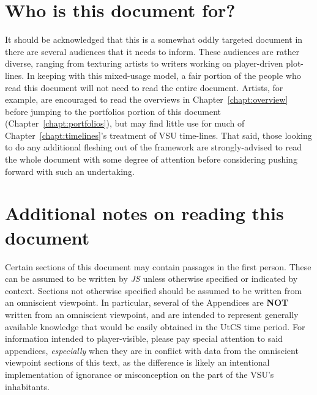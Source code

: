 \section*{Who is this document for?}
It should be acknowledged that this is a somewhat oddly targeted
document in there are several audiences that it needs to inform. These
audiences are rather diverse, ranging from texturing artists to
writers working on player-driven plot-lines. In keeping with this
mixed-usage model, a fair portion of the people who read this document
will not need to read the entire document. Artists, for example, are
encouraged to read the overviews in Chapter~\ref{chapt:overview}
before jumping to the portfolios portion of this document
(Chapter~\ref{chapt:portfolios}), but may find little use for much of
Chapter~\ref{chapt:timelines}'s treatment of VSU time-lines. That said,
those looking to do any additional fleshing out of the framework are
strongly-advised to read the whole document with some degree of
attention before considering pushing forward with such an undertaking.

\section*{Additional notes on reading this document}
Certain sections of this document may contain passages in the first
person. These can be assumed to be written by {\it JS} unless
otherwise specified or indicated by context. Sections not otherwise
specified should be assumed to be written from an omniscient
viewpoint. In particular, several of the Appendices are {\bf NOT}
written from an omniscient viewpoint, and are intended to represent
generally available knowledge that would be easily obtained in the
UtCS time period. For information intended to player-visible, please
pay special attention to said appendices, {\it especially} when they
are in conflict with data from the omniscient viewpoint sections of
this text, as the difference is likely an intentional implementation
of ignorance or misconception on the part of the VSU's inhabitants.

